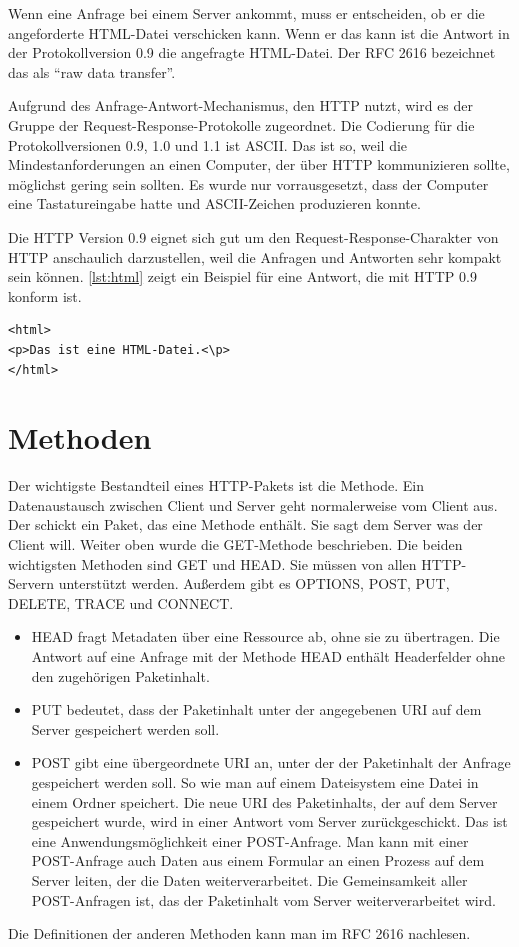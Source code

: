 \documentclass{llncs}
\begin{document}
Wenn eine Anfrage bei einem Server ankommt, muss er entscheiden, ob er die angeforderte HTML-Datei verschicken kann. Wenn er das kann ist die Antwort in der Protokollversion 0.9 die angefragte HTML-Datei. Der RFC 2616 bezeichnet das als ``raw data transfer''.

Aufgrund des Anfrage-Antwort-Mechanismus, den HTTP nutzt, wird es der Gruppe der Request-Response-Protokolle zugeordnet. Die Codierung für die Protokollversionen 0.9, 1.0 und 1.1 ist ASCII. Das ist so, weil die Mindestanforderungen an einen Computer, der über HTTP kommunizieren sollte, möglichst gering sein sollten. Es wurde nur vorrausgesetzt, dass der Computer eine Tastatureingabe hatte und ASCII-Zeichen produzieren konnte. \cite{Berners-Lee1999}

Die HTTP Version 0.9 eignet sich gut um den Request-Response-Charakter von HTTP anschaulich darzustellen, weil die Anfragen und Antworten sehr kompakt sein können. \ref{lst:html} zeigt ein Beispiel für eine Antwort, die mit HTTP 0.9 konform ist.

\lstset{ 
  xleftmargin=.2\textwidth, xrightmargin=.2\textwidth,
  basicstyle=\ttfamily
}
\begin{lstlisting}[caption={Antwort-Paket nach HTTP 0.9},label={lst:html}]
<html>
<p>Das ist eine HTML-Datei.<\p>
</html>
\end{lstlisting}

\section{Methoden}
Der wichtigste Bestandteil eines HTTP-Pakets ist die Methode. Ein Datenaustausch zwischen Client und Server geht normalerweise vom Client aus. Der schickt ein Paket, das eine Methode enthält. Sie sagt dem Server was der Client will. Weiter oben wurde die GET-Methode beschrieben. Die beiden wichtigsten Methoden sind GET und HEAD. Sie müssen von allen HTTP-Servern unterstützt werden. \cite{Fielding1999} Außerdem gibt es OPTIONS, POST, PUT, DELETE, TRACE und CONNECT. 

\begin{itemize}  
\item HEAD fragt Metadaten über eine Ressource ab, ohne sie zu übertragen. Die Antwort auf eine Anfrage mit der Methode HEAD enthält Headerfelder ohne den zugehörigen Paketinhalt.
\item PUT bedeutet, dass der Paketinhalt unter der angegebenen URI auf dem Server gespeichert werden soll. 
\item POST gibt eine übergeordnete URI an, unter der der Paketinhalt der Anfrage gespeichert werden soll. So wie man auf einem Dateisystem eine Datei in einem Ordner speichert. Die neue URI des Paketinhalts, der auf dem Server gespeichert wurde, wird in einer Antwort vom Server zurückgeschickt. Das ist eine Anwendungsmöglichkeit einer POST-Anfrage. Man kann mit einer POST-Anfrage auch Daten aus einem Formular an einen Prozess auf dem Server leiten, der die Daten weiterverarbeitet.
Die Gemeinsamkeit aller POST-Anfragen ist, das der Paketinhalt vom Server weiterverarbeitet wird.
\end{itemize}
Die Definitionen der anderen Methoden kann man im RFC 2616 nachlesen.
\end{document}
